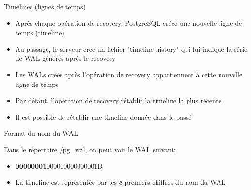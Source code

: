 
\begin{frame}[fragile]{Timelines (lignes de temps)}

\begin{itemize}

   \item Après chaque opération de recovery, PostgreSQL créée une nouvelle ligne de temps (timeline)
   \item Au passage, le serveur crée un fichier "timeline history" qui lui indique la série de WAL générés après le recovery
   \item Les WALs créés après l'opération de recovery appartiennent à cette nouvelle ligne de temps
   \item Par défaut, l'opération de recovery rétablit la timeline la plus récente
   \item Il est possible de rétablir une timeline donnée dans le passé


\end{itemize}

\begin{toile}
\end{toile}

\end{frame}



\begin{frame}[fragile]{Format du nom du WAL}

   Dans le répertoire /pg\_wal, on peut voir le WAL suivant:

\begin{itemize}

   \item \textbf{00000001}000000000000001B
   \item La timeline est représentée par les 8 premiers chiffres du nom du WAL

\end{itemize}

\begin{toile}
\end{toile}

\end{frame}



